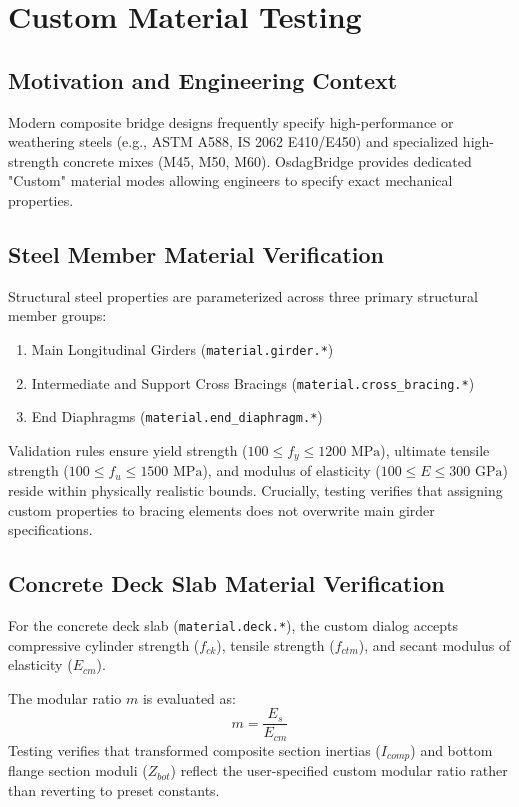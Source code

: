 \chapter{Custom Material Testing}
\label{chap:custom_materials}

\section{Motivation and Engineering Context}
Modern composite bridge designs frequently specify high-performance or weathering steels (e.g., ASTM A588, IS 2062 E410/E450) and specialized high-strength concrete mixes (M45, M50, M60). OsdagBridge provides dedicated "Custom" material modes allowing engineers to specify exact mechanical properties.

\section{Steel Member Material Verification}
Structural steel properties are parameterized across three primary structural member groups:
\begin{enumerate}
    \item Main Longitudinal Girders (\texttt{material.girder.*})
    \item Intermediate and Support Cross Bracings (\texttt{material.cross\_bracing.*})
    \item End Diaphragms (\texttt{material.end\_diaphragm.*})
\end{enumerate}

Validation rules ensure yield strength ($100 \le f_y \le 1200\text{ MPa}$), ultimate tensile strength ($100 \le f_u \le 1500\text{ MPa}$), and modulus of elasticity ($100 \le E \le 300\text{ GPa}$) reside within physically realistic bounds. Crucially, testing verifies that assigning custom properties to bracing elements does not overwrite main girder specifications.

\section{Concrete Deck Slab Material Verification}
For the concrete deck slab (\texttt{material.deck.*}), the custom dialog accepts compressive cylinder strength ($f_{ck}$), tensile strength ($f_{ctm}$), and secant modulus of elasticity ($E_{cm}$). 

The modular ratio $m$ is evaluated as:
\begin{equation}
    m = \frac{E_s}{E_{cm}}
\end{equation}
Testing verifies that transformed composite section inertias ($I_{comp}$) and bottom flange section moduli ($Z_{bot}$) reflect the user-specified custom modular ratio rather than reverting to preset constants.
